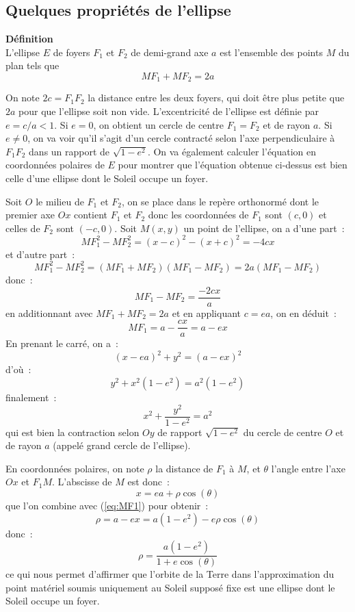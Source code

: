 \documentclass[a4paper,11pt]{article}
\begin{document}
\begin{giacjshere}
\subsection{Quelques propriétés de l'ellipse}
{\bf D\'efinition}\\
L'ellipse $E$ de foyers $F_1$ et $F_2$ de demi-grand axe
$a$ est l'ensemble des points $M$ du plan tels que 
\[ MF_1+MF_2=2a\]

On note $2c=F_1F_2$ la distance entre les deux foyers, qui doit \^etre
plus petite que $2a$ pour que l'ellipse soit non vide.
L'excentricit\'e de l'ellipse est d\'efinie par $e=c/a < 1$. Si $e=0$,
on obtient un cercle de centre $F_1=F_2$ et de rayon $a$. Si $e\neq 0$,
on va voir qu'il s'agit d'un cercle contracté
selon l'axe perpendiculaire \`a $F_1F_2$ dans un rapport de 
$\sqrt{1-e^2}$. On va \'egalement calculer l'\'equation en
coordonn\'ees polaires de $E$ pour montrer que l'\'equation obtenue
ci-dessus est bien celle d'une ellipse dont le Soleil occupe un foyer.

Soit $O$ le milieu de $F_1$ et $F_2$, on se place dans le rep\`ere orthonorm\'e
dont le premier axe $Ox$ contient $F_1$ et $F_2$ donc les
coordonn\'ees de $F_1$ sont $(c,0)$ et celles de $F_2$ sont $(-c,0)$. 
Soit $M(x,y)$ un
point de l'ellipse, on a d'une part~:
\[ MF_1^2 - MF_2^2 = (x-c)^2-(x+c)^2 = -4cx \]
et d'autre part~:
\[ MF_1^2 - MF_2^2 = (MF_1 + MF_2)(MF_1 - MF_2 ) = 2a (MF_1 - MF_2 )\]
donc~:
\[ MF_1 - MF_2 = \frac{-2cx}{a} \]
en additionnant avec $MF_1+MF_2=2a$ et en appliquant $c=ea$, on en d\'eduit~:
\begin{equation} \label{eq:MF1bis}
 MF_1 = a - \frac{cx}{a} = a-ex 
\end{equation}
En prenant le carr\'e, on a~:
\[ (x-ea)^2 + y^2 = (a-ex)^2\]
d'o\`u~:
\[ y^2 + x^2 (1-e^2) = a^2(1-e^2) \]
finalement~:
\[ x^2 + \frac{y^2}{1-e^2} = a^2 \]
qui est bien la contraction selon $Oy$ de rapport $\sqrt{1-e^2}$ du
cercle de centre $O$ et de rayon $a$ (appel\'e grand cercle de
l'ellipse).

En coordonn\'ees polaires, on note $\rho$ la distance de $F_1$ \`a
$M$, et $\theta$ l'angle entre l'axe $Ox$ et $F_1M$. L'abscisse de $M$
est donc~:
\[ x= ea + \rho \cos(\theta)\]
que l'on combine avec (\ref{eq:MF1}) pour obtenir~:
\[ \rho = a-ex =a(1-e^2) - e \rho \cos(\theta) \]
donc~:
\[ \rho = \frac{a(1-e^2)}{1+e\cos(\theta)} \]
ce qui nous permet d'affirmer que l'orbite de la Terre dans
l'approximation du point mat\'eriel soumis uniquement au Soleil
suppos\'e fixe est une ellipse dont le Soleil occupe un foyer.


\end{giacjshere}
\end{document}
